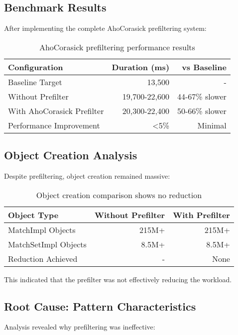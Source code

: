 \documentclass[11pt,a4paper]{article}
\begin{document}
\subsection{Benchmark Results}

After implementing the complete AhoCorasick prefiltering system:

\begin{table}[h]
\centering
\begin{tabular}{lrr}
\toprule
Configuration & Duration (ms) & vs Baseline \\
\midrule
Baseline Target & 13,500 & - \\
Without Prefilter & 19,700-22,600 & 44-67\% slower \\
With AhoCorasick Prefilter & 20,300-22,400 & 50-66\% slower \\
Performance Improvement & <5\% & Minimal \\
\bottomrule
\end{tabular}
\caption{AhoCorasick prefiltering performance results}
\end{table}

\subsection{Object Creation Analysis}

Despite prefiltering, object creation remained massive:

\begin{table}[h]
\centering
\begin{tabular}{lrr}
\toprule
Object Type & Without Prefilter & With Prefilter \\
\midrule
MatchImpl Objects & 215M+ & 215M+ \\
MatchSetImpl Objects & 8.5M+ & 8.5M+ \\
Reduction Achieved & - & None \\
\bottomrule
\end{tabular}
\caption{Object creation comparison shows no reduction}
\end{table}

This indicated that the prefilter was not effectively reducing the workload.

\subsection{Root Cause: Pattern Characteristics}

Analysis revealed why prefiltering was ineffective:
\end{document}
